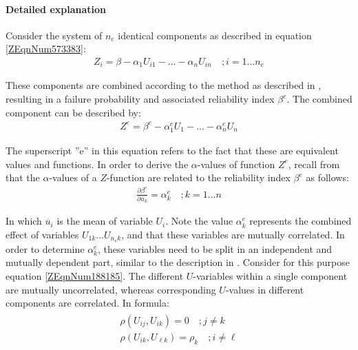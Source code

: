 {\paragraph*{Detailed explanation}

Consider the system of $n_e$ identical components as described in equation \eqref{ZEqnNum573383}:
\begin{align}
Z_{i} =\beta -\alpha _{1} U_{i1} -...-\alpha _{n} U_{in} \quad ;i=1...n_{e} \label{ZEqnNum188185} 
\end{align}

These components are combined according to the method as described in , resulting in a failure probability and associated reliability index $\beta^e$.
The combined component can be described by: %
\begin{align}
Z^{e} =\beta ^{e} -\alpha _{1}^{e} U_{1} -...-\alpha _{n}^{e} U_{n} \label{ZEqnNum266010} 
\end{align}

The superscript ''e'' in this equation refers to the fact that these are equivalent values and functions.
In order to derive the $\alpha$-values of function $Z^e$, recall from  that the $\alpha$-values of a $Z$-function are related to the reliability index $\beta^e$ as follows: 
\begin{align}
\frac{\partial \beta ^{e} }{\partial \bar{u}_{k} } =\alpha _{k}^{e} \quad ;k=1...n\label{0.148)} 
\end{align}

In which $\overline{u}_i$ is the mean of variable $U_i$.
Note the value $\alpha_k^e$ represents the combined effect of variables $U_{1k}$...$U_{n_{e}k}$, and that these variables are mutually correlated.
In order to determine $\alpha_k^e$, these variables need to be split in an independent and mutually dependent part, similar to the description in .
Consider for this purpose equation \eqref{ZEqnNum188185}.
The different $U$-variables within a single component are mutually uncorrelated, whereas corresponding $U$-values in different components are correlated.
In formula:
\begin{align}
\begin{array}{l} {\rho \left(U_{ij} ,U_{ik} \right)=0\quad   ;j\ne k} \\ {\rho \left(U_{ik} ,U_{\ell k} \right)=\rho _{k} \quad ;i\ne \ell } \end{array}\label{ZEqnNum568983} 
\end{align}

}
